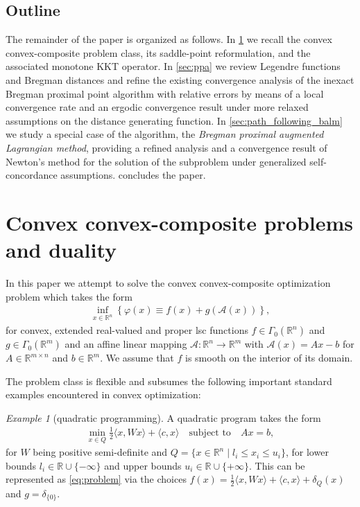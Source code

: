 \documentclass[11pt,onecolumn]{article}
\newcommand{\bR}{\mathbb{R}}
\theoremstyle{remark}
\newtheorem{example}[example]{Example}
\begin{document}
\subsection{Outline}

The remainder of the paper is organized as follows.
In \cref{sec:problem} we recall the convex convex-composite problem class, its saddle-point reformulation, and the associated monotone KKT operator.
In \cref{sec:ppa} we review Legendre functions and Bregman distances and refine the existing convergence analysis of the inexact Bregman proximal point algorithm with relative errors \cite{solodov2000inexact} by means of a local convergence rate and an ergodic convergence result under more relaxed assumptions on the distance generating function. In \cref{sec:path_following_balm} we study a special case of the algorithm, the \emph{Bregman proximal augmented Lagrangian method}, providing a refined analysis and a convergence result of Newton's method for the solution of the subproblem under generalized self-concordance assumptions.
 concludes the paper.



\section{Convex convex-composite problems and duality} \label{sec:problem}
In this paper we attempt to solve the convex convex-composite optimization problem which takes the form
\begin{align} \label{eq:problem}
\inf_{x \in \bR^n} \left\{\varphi(x) \equiv f(x) + g(\mathcal{A}(x))\right\},
\end{align}
for convex, extended real-valued and proper lsc functions $f \in \Gamma_0(\bR^n)$ and $g \in \Gamma_0(\bR^m)$ and an affine linear mapping $\mathcal{A}:\bR^n \to \bR^m$ with $\mathcal{A}(x)=Ax-b$ for $A\in \bR^{m \times n}$ and $b\in \bR^m$.
We assume that $f$ is smooth on the interior of its domain.

The problem class is flexible and subsumes the following important standard examples encountered in convex optimization:
\begin{example}[quadratic programming] \label{ex:qp}
A quadratic program takes the form
\begin{align}
\min_{x \in Q} \tfrac{1}{2}\langle x, W x\rangle + \langle c, x\rangle \quad \text{subject to}\quad Ax = b,
\end{align}
for $W$ being positive semi-definite and $Q=\{x \in \bR^n \mid l_i \leq x_i \leq u_i\}$, for lower bounds $l_i \in \bR \cup\{-\infty\}$ and upper bounds $u_i \in \bR \cup\{+\infty\}$. This can be represented as \cref{eq:problem} via the choices $f(x)=\frac{1}{2}\langle x, W x\rangle + \langle c, x\rangle + \delta_Q(x)$ and $g=\delta_{\{0\}}$. 
\end{example}
\end{document}
